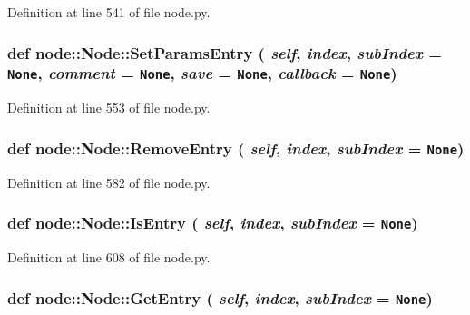Definition at line 541 of file node.py.\hypertarget{classnode_1_1Node_68c201e7e4fcd6335b00ac2edd296ebc}{
\subsubsection[SetParamsEntry]{\setlength{\rightskip}{0pt plus 5cm}def node::Node::Set\-Params\-Entry ( {\em self},  {\em index},  {\em sub\-Index} = {\tt None},  {\em comment} = {\tt None},  {\em save} = {\tt None},  {\em callback} = {\tt None})}}
\label{classnode_1_1Node_68c201e7e4fcd6335b00ac2edd296ebc}




Definition at line 553 of file node.py.\hypertarget{classnode_1_1Node_c6ddda522758006f1c267cbc410873df}{
\subsubsection[RemoveEntry]{\setlength{\rightskip}{0pt plus 5cm}def node::Node::Remove\-Entry ( {\em self},  {\em index},  {\em sub\-Index} = {\tt None})}}
\label{classnode_1_1Node_c6ddda522758006f1c267cbc410873df}




Definition at line 582 of file node.py.\hypertarget{classnode_1_1Node_b261871916d7e1a5e2cfdac6af8486d1}{
\subsubsection[IsEntry]{\setlength{\rightskip}{0pt plus 5cm}def node::Node::Is\-Entry ( {\em self},  {\em index},  {\em sub\-Index} = {\tt None})}}
\label{classnode_1_1Node_b261871916d7e1a5e2cfdac6af8486d1}




Definition at line 608 of file node.py.\hypertarget{classnode_1_1Node_3ce4e08d5777303266e2b62b2e9c70f8}{
\subsubsection[GetEntry]{\setlength{\rightskip}{0pt plus 5cm}def node::Node::Get\-Entry ( {\em self},  {\em index},  {\em sub\-Index} = {\tt None})}}
\label{classnode_1_1Node_3ce4e08d5777303266e2b62b2e9c70f8}




